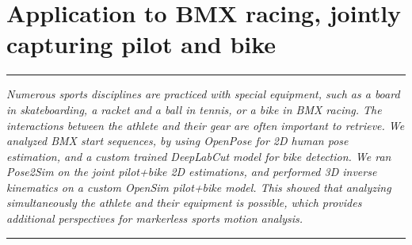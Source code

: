
\lhead[\fancyplain{}{\leftmark}]%
      {\fancyplain{}{}} %
\chead[\fancyplain{}{}]%
      {\fancyplain{}{}}
\rhead[\fancyplain{}{}]%
      {\fancyplain{}{\rightmark}}%
\lfoot[\fancyplain{}{}]%
      {\fancyplain{}{}}
\cfoot[\fancyplain{}{\thepage}]%
      {\fancyplain{}{\thepage}} %
\rfoot[\fancyplain{}{}]%
     {\fancyplain{}{\scriptsize}}



\chapter{Application to BMX racing, jointly capturing pilot and bike}
\label{ch:7}


\begin{center}
\rule{0.7\linewidth}{.5pt}
\begin{minipage}{0.7\linewidth}
\smallskip

\textit{Numerous sports disciplines are practiced with special equipment, such as a board in skateboarding, a racket and a ball in tennis, or a bike in BMX racing. The interactions between the athlete and their gear are often important to retrieve. We analyzed BMX start sequences, by using OpenPose for 2D human pose estimation, and a custom trained DeepLabCut model for bike detection. We ran Pose2Sim on the joint {pilot+bike} 2D estimations, and performed 3D inverse kinematics on a custom OpenSim {pilot+bike} model. This showed that analyzing simultaneously the athlete and their equipment is possible, which provides additional perspectives for markerless sports motion analysis.
}

\end{minipage}
\smallskip
\rule{0.7\linewidth}{.5pt}
\end{center}

